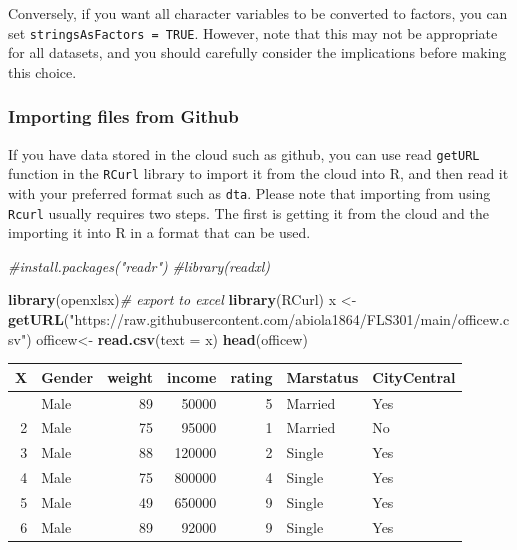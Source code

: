 \documentclass[
]{article}
\newenvironment{Shaded}{\begin{snugshade}}{\end{snugshade}}
\newcommand{\AttributeTok}[1]{\textcolor[rgb]{0.13,0.29,0.53}{#1}}
\newcommand{\CommentTok}[1]{\textcolor[rgb]{0.56,0.35,0.01}{\textit{#1}}}
\newcommand{\FunctionTok}[1]{\textcolor[rgb]{0.13,0.29,0.53}{\textbf{#1}}}
\newcommand{\NormalTok}[1]{#1}
\newcommand{\OtherTok}[1]{\textcolor[rgb]{0.56,0.35,0.01}{#1}}
\newcommand{\StringTok}[1]{\textcolor[rgb]{0.31,0.60,0.02}{#1}}
\begin{document}
Conversely, if you want all character variables to be converted to
factors, you can set \texttt{stringsAsFactors\ =\ TRUE}. However, note
that this may not be appropriate for all datasets, and you should
carefully consider the implications before making this choice.

\hypertarget{importing-files-from-github}{%
\subsubsection{Importing files from
Github}\label{importing-files-from-github}}

If you have data stored in the cloud such as github, you can use read
\texttt{getURL} function in the \texttt{RCurl} library to import it from
the cloud into R, and then read it with your preferred format such as
\texttt{dta}. Please note that importing from using \texttt{Rcurl}
usually requires two steps. The first is getting it from the cloud and
the importing it into R in a format that can be used.

\begin{Shaded}
\begin{Highlighting}[]
\CommentTok{\#install.packages("readr")}
\CommentTok{\#library(readxl)}

\FunctionTok{library}\NormalTok{(openxlsx)}\CommentTok{\# export to excel}
\FunctionTok{library}\NormalTok{(RCurl)}
\NormalTok{x }\OtherTok{\textless{}{-}} \FunctionTok{getURL}\NormalTok{(}\StringTok{"https://raw.githubusercontent.com/abiola1864/FLS301/main/officew.csv"}\NormalTok{)}
\NormalTok{officew}\OtherTok{\textless{}{-}} \FunctionTok{read.csv}\NormalTok{(}\AttributeTok{text =}\NormalTok{ x)}
\FunctionTok{head}\NormalTok{(officew)}
\end{Highlighting}
\end{Shaded}

\begin{longtable}[]{@{}rlrrrll@{}}
\toprule\noalign{}
X & Gender & weight & income & rating & Marstatus & CityCentral \\
\midrule\noalign{}
\endhead
\bottomrule\noalign{}
\endlastfoot
1 & Male & 89 & 50000 & 5 & Married & Yes \\
2 & Male & 75 & 95000 & 1 & Married & No \\
3 & Male & 88 & 120000 & 2 & Single & Yes \\
4 & Male & 75 & 800000 & 4 & Single & Yes \\
5 & Male & 49 & 650000 & 9 & Single & Yes \\
6 & Male & 89 & 92000 & 9 & Single & Yes \\
\end{longtable}
\end{document}
